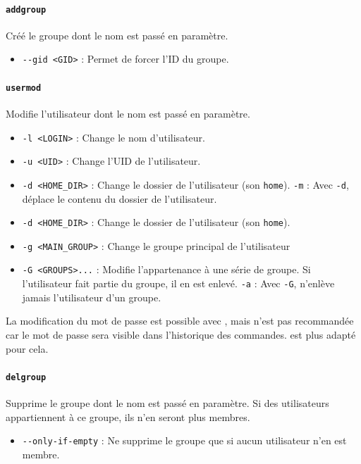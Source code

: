 \paragraph{\texttt{addgroup}} 
Créé le groupe dont le nom est passé en paramètre.
\begin{itemize}
    \item \texttt{-{}-gid <GID>} : Permet de forcer l'ID du groupe.
\end{itemize}\vspace{\baselineskip}


\paragraph{\texttt{usermod}} 
Modifie l'utilisateur dont le nom est passé en paramètre.
\begin{itemize}
    \item \texttt{-l <LOGIN>} : Change le nom d'utilisateur.
    \item \texttt{-u <UID>} : Change l'UID de l'utilisateur.
    \item \texttt{-d <HOME\_DIR>} : Change le dossier de l'utilisateur (son \texttt{home}). \newline
        \texttt{-m} : Avec \texttt{-d}, déplace le contenu du dossier de l'utilisateur.
    \item \texttt{-d <HOME\_DIR>} : Change le dossier de l'utilisateur (son \texttt{home}).
    \item \texttt{-g <MAIN\_GROUP>} : Change le groupe principal de l'utilisateur
    \item \texttt{-G <GROUPS>...} : Modifie l'appartenance à une série de groupe. Si l'utilisateur fait partie du groupe, il en est enlevé. \newline
        \texttt{-a} : Avec \texttt{-G}, n'enlève jamais l'utilisateur d'un groupe.
\end{itemize}
La modification du mot de passe est possible avec , mais n'est pas recommandée car le mot de passe sera visible dans l'historique des commandes.  est plus adapté pour cela.\vspace{\baselineskip}

\paragraph{\texttt{delgroup}} 
Supprime le groupe dont le nom est passé en paramètre. Si des utilisateurs appartiennent à ce groupe, ils n'en seront plus membres.
\begin{itemize}
    \item \texttt{-{}-only-if-empty} : Ne supprime le groupe que si aucun utilisateur n'en est membre.
\end{itemize}\vspace{\baselineskip}

